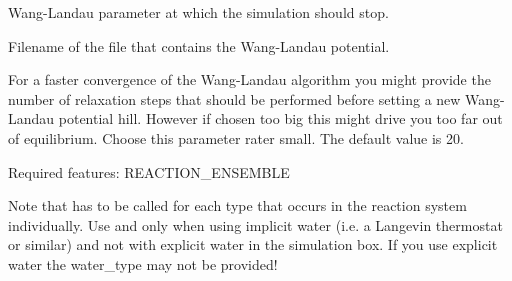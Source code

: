 \begin{arguments}
\item[\var{final\_wang\_landau\_parameter}] Wang-Landau parameter at which the simulation should stop.
\item[\var{full\_path\_to\_output\_filename}] Filename of the file that contains the Wang-Landau potential.
\item[\var{wang\_landau\_relaxation\_setps}] For a faster convergence of the Wang-Landau algorithm you might provide the number of relaxation steps that should be performed before setting a new Wang-Landau potential hill. However if chosen too big this might drive you too far out of equilibrium. Choose this parameter rater small. The default value is 20.

Required features: REACTION_ENSEMBLE
\end{arguments}
Note that  has to be called for each type that occurs in the reaction system individually. Use  and  only when using implicit water (i.e. a Langevin thermostat or similar) and not with explicit water in the simulation box. If you use explicit water the water\_type may not be provided!

